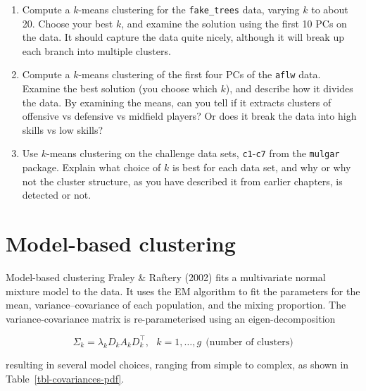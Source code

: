 \documentclass[
  letterpaper,
]{krantz}
\providecommand{\tightlist}{%
  \setlength{\itemsep}{0pt}\setlength{\parskip}{0pt}}\usepackage{longtable,booktabs,array}
\begin{document}
\begin{enumerate}
\def\labelenumi{\arabic{enumi}.}
\tightlist
\item
  Compute a \(k\)-means clustering for the \texttt{fake\_trees} data,
  varying \(k\) to about 20. Choose your best \(k\), and examine the
  solution using the first 10 PCs on the data. It should capture the
  data quite nicely, although it will break up each branch into multiple
  clusters.
\item
  Compute a \(k\)-means clustering of the first four PCs of the
  \texttt{aflw} data. Examine the best solution (you choose which
  \(k\)), and describe how it divides the data. By examining the means,
  can you tell if it extracts clusters of offensive vs defensive vs
  midfield players? Or does it break the data into high skills vs low
  skills?
\item
  Use \(k\)-means clustering on the challenge data sets,
  \texttt{c1}-\texttt{c7} from the \texttt{mulgar} package. Explain what
  choice of \(k\) is best for each data set, and why or why not the
  cluster structure, as you have described it from earlier chapters, is
  detected or not.
\end{enumerate}


\chapter{Model-based clustering}\label{sec-mclust}


Model-based clustering Fraley \& Raftery (2002) fits a multivariate
normal mixture model to the data. It uses the EM algorithm to fit the
parameters for the mean, variance--covariance of each population, and
the mixing proportion. The variance-covariance matrix is
re-parameterised using an eigen-decomposition

\[
\Sigma_k = \lambda_kD_kA_kD_k^\top, ~~~k=1, \dots, g ~~\mbox{(number of clusters)}
\]

\noindent resulting in several model choices, ranging from simple to
complex, as shown in Table~\ref{tbl-covariances-pdf}.
\end{document}
